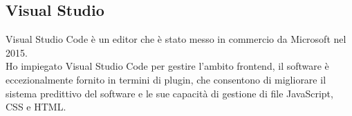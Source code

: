 \subsection{Visual Studio}
Visual Studio Code è un editor che è stato messo in commercio da Microsoft nel 2015.
\\
Ho impiegato Visual Studio Code per gestire l'ambito frontend, il software è eccezionalmente fornito in termini di plugin, che consentono di migliorare il sistema predittivo del software e le sue capacità di gestione di file JavaScript, CSS e HTML.